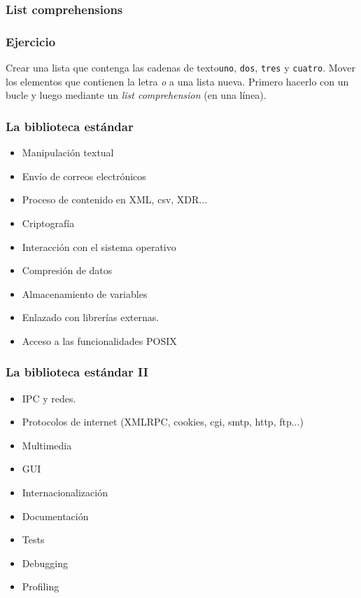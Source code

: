 \documentclass{beamer}
\begin{document}
\begin{frame}
  \frametitle{List comprehensions}
  \testcode
\end{frame}

\begin{frame}
  \frametitle{Ejercicio}
  Crear una lista que contenga las cadenas de texto\texttt{uno},
  \texttt{dos}, \texttt{tres} y \texttt{cuatro}.  Mover los elementos
  que contienen la letra \emph{o} a una lista nueva. Primero hacerlo
  con un bucle y luego mediante un \emph{list comprehension} (en una
  línea).
\end{frame}

\begin{frame}
  \frametitle{La biblioteca estándar}
  \begin{itemize}
  \item Manipulación textual
  \item Envío de correos electrónicos
  \item Proceso de contenido en XML, csv, XDR...
  \item Criptografía
  \item Interacción con el sistema operativo
  \item Compresión de datos
  \item Almacenamiento de variables
  \item Enlazado con librerías externas.
  \item Acceso a las funcionalidades POSIX
  \end{itemize}
\end{frame}

\begin{frame}
\frametitle{La biblioteca estándar II}
\begin{itemize}
\item IPC y redes.
  \item Protocolos de internet (XMLRPC, cookies, cgi, smtp, http, ftp...)
  \item Multimedia
  \item GUI
  \item Internacionalización
  \item Documentación
  \item Tests
  \item Debugging
  \item Profiling
\end{itemize}
\end{frame}
\end{document}
